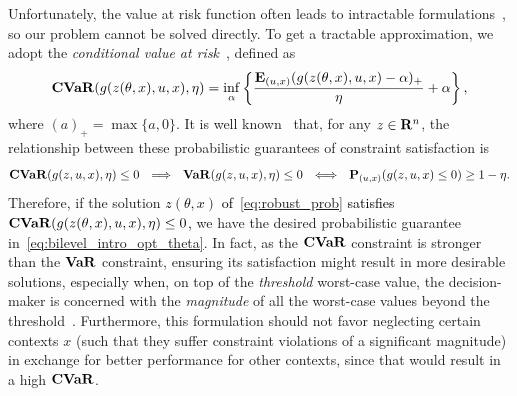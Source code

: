\documentclass[11pt]{article}
\newcommand{\RC}[1]{\textcolor{black}{#1}}
\begin{document}
Unfortunately, the value at risk function often leads to intractable formulations~\citep{cvaropt}, so our problem cannot be solved directly. 
To get a tractable approximation, we adopt the {\it conditional value at risk}~\citep{cvaropt,cvar}, defined as
\begin{equation*}
	\label{eq:cvar}
\mathop{\bf CVaR}(g(z(\theta,x),u,x),\eta) = \inf_{\alpha}\left\{\frac{\mathbf{E}_{(u,x)} (g(z(\theta,x),u,x)- \alpha)_+}{\eta} + \alpha\right\},
\end{equation*}
where $(a)_+ = \max\{a,0\}$. It is well known~\citep{cvaropt} that, for any \RC{$z \in {\mathbf R}^n$}, the relationship between these probabilistic guarantees of constraint satisfaction is
\begin{equation*}
	\label{eq:imply}
\mathop{\bf CVaR}(g(z,u, x),\eta) \leq 0 ~~\Longrightarrow~~ \mathop{\bf VaR}(g(z,u,x),\eta)\leq 0 ~~\Longleftrightarrow ~~ {\mathbf P}_{(u,x)}(g(z,u,x)\leq 0) \geq 1 - \eta.
\end{equation*}
Therefore, if the solution \RC{$z(\theta,x)$ of~\eqref{eq:robust_prob} satisfies $\mathop{\bf CVaR}(g(z(\theta,x),u,x),\eta) \leq 0$,} we have the desired probabilistic guarantee in~\eqref{eq:bilevel_intro_opt_theta}.
In fact, as the $\mathop{\bf CVaR}$ constraint is stronger than the $\bf{VaR}$ constraint, ensuring its satisfaction might result in more desirable solutions, especially when, on top of the {\it threshold} worst-case value, the decision-maker is concerned with the {\it magnitude} of all the worst-case values beyond the threshold~\citep{cvar_var}. Furthermore, this formulation should not favor neglecting certain contexts $x$ (such that they suffer constraint violations of a significant magnitude) in exchange for better performance for other contexts, since that would result in a high $\mathop{\bf CVaR}$.
\end{document}

